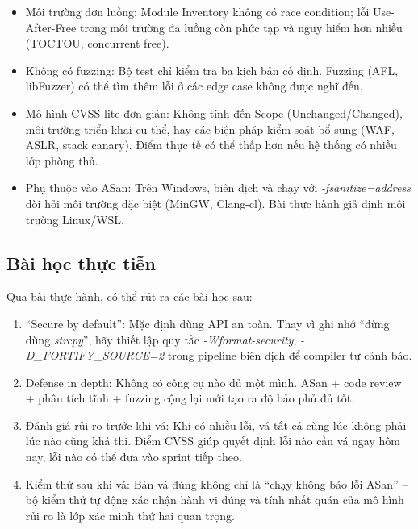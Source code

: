 \begin{itemize}
    \item Môi trường đơn luồng: Module Inventory không có race condition; lỗi
          Use-After-Free trong môi trường đa luồng còn phức tạp và nguy hiểm
          hơn nhiều (TOCTOU, concurrent free).
    \item Không có fuzzing: Bộ test chỉ kiểm tra ba kịch bản cố định. Fuzzing
          (AFL, libFuzzer) có thể tìm thêm lỗi ở các edge case không được nghĩ
          đến.
    \item Mô hình CVSS-lite đơn giản: Không tính đến Scope (Unchanged/Changed),
          môi trường triển khai cụ thể, hay các biện pháp kiểm soát bổ sung
          (WAF, ASLR, stack canary). Điểm thực tế có thể thấp hơn nếu hệ thống
          có nhiều lớp phòng thủ.
    \item Phụ thuộc vào ASan: Trên Windows, biên dịch và chạy với
          \textit{-fsanitize=address} đòi hỏi môi trường đặc biệt (MinGW,
          Clang-cl). Bài thực hành giả định môi trường Linux/WSL.
\end{itemize}

\subsection{Bài học thực tiễn}

Qua bài thực hành, có thể rút ra các bài học sau:

\begin{enumerate}
    \item ``Secure by default'': Mặc định dùng API an toàn. Thay vì ghi nhớ
          ``đừng dùng \textit{strcpy}'', hãy thiết lập quy tắc
          \textit{-Wformat-security}, \textit{-D\_FORTIFY\_SOURCE=2} trong
          pipeline biên dịch để compiler tự cảnh báo.
    \item Defense in depth: Không có công cụ nào đủ một mình. ASan + code review
          + phân tích tĩnh + fuzzing cộng lại mới tạo ra độ bảo phủ đủ tốt.
    \item Đánh giá rủi ro trước khi vá: Khi có nhiều lỗi, vá tất cả cùng lúc
          không phải lúc nào cũng khả thi. Điểm CVSS giúp quyết định lỗi nào
          cần vá ngay hôm nay, lỗi nào có thể đưa vào sprint tiếp theo.
    \item Kiểm thử sau khi vá: Bản vá đúng không chỉ là ``chạy không báo lỗi
          ASan'' -- bộ kiểm thử tự động xác nhận hành vi đúng và tính nhất quán
          của mô hình rủi ro là lớp xác minh thứ hai quan trọng.
\end{enumerate}

